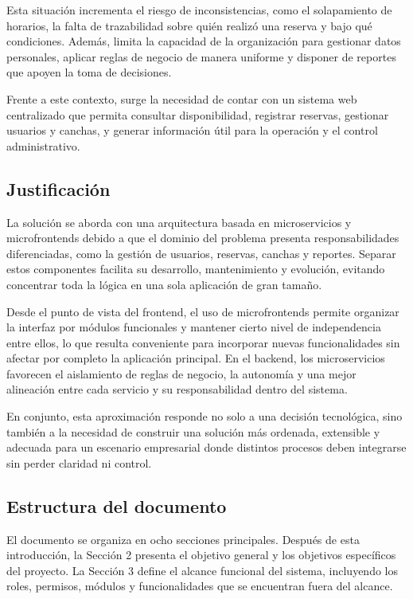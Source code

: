 Esta situación incrementa el riesgo de inconsistencias, como el solapamiento de horarios, la falta de trazabilidad sobre 
quién realizó una reserva y bajo qué condiciones. Además, limita la capacidad de la organización para gestionar datos personales, 
aplicar reglas de negocio de manera uniforme y disponer de reportes que apoyen la toma de decisiones.

Frente a este contexto, surge la necesidad de contar con un sistema web centralizado que permita consultar disponibilidad,
registrar reservas, gestionar usuarios y canchas, y generar información útil para la operación y el control administrativo.

\subsection{Justificación}
\label{sec:justificacion}

La solución se aborda con una arquitectura basada en microservicios y microfrontends debido a que el dominio del problema
presenta responsabilidades diferenciadas, como la gestión de usuarios, reservas, canchas y reportes. Separar estos componentes
facilita su desarrollo, mantenimiento y evolución, evitando concentrar toda la lógica en una sola aplicación de gran tamaño.

Desde el punto de vista del frontend, el uso de microfrontends permite organizar la interfaz por módulos funcionales y mantener
cierto nivel de independencia entre ellos, lo que resulta conveniente para incorporar nuevas funcionalidades sin afectar por
completo la aplicación principal. En el backend, los microservicios favorecen el aislamiento de reglas de negocio, la autonomía
y una mejor alineación entre cada servicio y su responsabilidad dentro del sistema.

En conjunto, esta aproximación responde no solo a una decisión tecnológica, sino también a la necesidad de construir una
solución más ordenada, extensible y adecuada para un escenario empresarial donde distintos procesos deben integrarse sin perder
claridad ni control.

\subsection{Estructura del documento}
\label{sec:estructura}

El documento se organiza en ocho secciones principales. Después de esta
introducción, la Sección 2 presenta el objetivo general y los objetivos
específicos del proyecto. La Sección 3 define el alcance funcional del sistema,
incluyendo los roles, permisos, módulos y funcionalidades que se encuentran
fuera del alcance.

